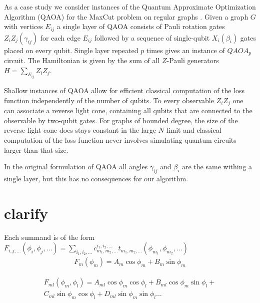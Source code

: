 \documentclass[twocolumn, amsfonts, amssymb, aps, nofootinbib]{revtex4-2}
\begin{document}
As a case study we consider instances of the Quantum Approximate Optimization Algorithm (QAOA) for the MaxCut problem on regular graphs \cite{Farhi2014}. Given a graph $G$ with vertices $E_{ij}$ a single layer of QAOA consists of Pauli rotation gates $Z_iZ_j(\gamma_{ij})$ for each edge $E_{ij}$ followed by a sequence of single-qubit $X_i(\beta_i)$ gates placed on every qubit. Single layer repeated $p$ times gives an instance of $QAOA_p$ circuit. The Hamiltonian is given by the sum of all $Z$-Pauli generators $H=\sum_{E_{ij}}Z_iZ_j$.

Shallow instances of QAOA allow for efficient classical computation of the loss function independently of the number of qubits. To every observable $Z_iZ_j$ one can associate a reverse light cone, containing all qubits that are connected to the observable by two-qubit gates. For graphs of bounded degree, the size of the reverse light cone does stays constant in the large $N$ limit and classical computation of the loss function never involves simulating quantum circuits larger than that size.

 In the original formulation of QAOA all angles $\gamma_{ij}$ and $\beta_i$ are the same withing a single layer, but this has no consequences for our algorithm.

\appendix
\section{clarify}

Each summand is of the form $F_{i,j,\dots}(\phi_i,\phi_j,\dots)=\sum_{i_1,i_2,\dots}c^{i_1,i_2,\dots}_{m_1,m_2,\dots}t_{m_1, m_2,\dots}(\phi_{m_1},\phi_{m_2},\dots)$
\begin{align}
F_m(\phi_m)=A_m\cos\phi_m+B_m\sin\phi_m
\end{align}

\begin{multline}
F_{ml}(\phi_m,\phi_l)=A_{ml}\cos\phi_m\cos\phi_l+B_{ml}\cos\phi_m\sin\phi_l+\\C_{ml}\sin\phi_m\cos\phi_l+D_{ml}\sin\phi_m\sin\phi_l\dots
\end{multline}



\end{document}
